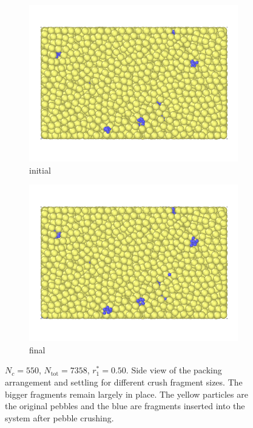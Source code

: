 \begin{figure}[!ht]
	\begin{subfigure}[b]{\doubleimagewidth}
		\centering
		\includegraphics[width=\textwidth]{chapters/figures/crush-fragments/0.50-1.png}
		\caption{initial}
	\end{subfigure}
	\begin{subfigure}[b]{\doubleimagewidth}
		\centering
		\includegraphics[width=\textwidth]{chapters/figures/crush-fragments/0.50-2.png}
		\caption{final}
	\end{subfigure}
	\caption{$N_c = 550$, $N_\text{tot} = 7358$, $r_1^* = 0.50$. Side view of the packing arrangement and settling for different crush fragment sizes. The bigger fragments remain largely in place. The yellow particles are the original pebbles and the blue are fragments inserted into the system after pebble crushing.}
\label{fig:crush-settling-pictures-4}
\end{figure}
\FloatBarrier

